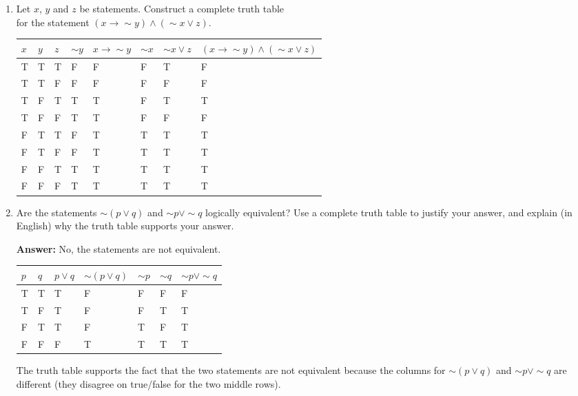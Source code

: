 \documentclass[12pt, letterpaper]{report}
\newcommand{\nott}{{\sim}}
\newcommand{\ans}{\textbf{Answer: }}
\begin{document}
\begin{enumerate}
\begin{enumerate}
        \end{enumerate}

	
	\item Let $x$, $y$ and $z$ be statements.  Construct a complete truth table\\ for the 
	statement $(x \to \nott y) \land (\nott x \lor z)$.
	
	\begin{tabular}{|l|l|l|l|l|l|l|l|} \hline
        $x$ & $y$ & $z$ & $\nott y$ & $x \to \nott y$ & $\nott x$ & $\nott x \lor z$ & $(x \to \nott y) \land (\nott x \lor z)$  \\ \hline
         T & T & T & F & F & F & T & F \\ \hline
         T & T & F & F & F & F & F & F \\ \hline
         T & F & T & T & T & F & T & T \\ \hline
         T & F & F & T & T & F & F & F \\ \hline
         F & T & T & F & T & T & T & T \\ \hline
         F & T & F & F & T & T & T & T \\ \hline
         F & F & T & T & T & T & T & T \\ \hline
         F & F & F & T & T & T & T & T \\ \hline
	\end{tabular}

	
	\item Are the statements $\nott (p \lor q)$ and $\nott p \lor \nott q$ logically equivalent?  Use a complete truth table to justify
	your answer, and explain (in English) why the truth table supports your answer.
	
	\ans No, the statements are not equivalent.
	
	\begin{tabular}{|l|l|l|l|l|l|l|} \hline
        $p$ & $q$ & $p \lor q$ & $\nott (p \lor q)$ & $\nott p$ & $\nott q$ & $\nott p \lor \nott q$   \\ \hline
         T & T & T & F & F & F & F \\ \hline
         T & F & T & F & F & T & T \\ \hline
         F & T & T & F & T & F & T \\ \hline
         F & F & F & T & T & T & T \\ \hline
	\end{tabular}
	
	The truth table supports the fact that the two statements are not equivalent because the columns for 
	$\nott (p \lor q)$ and $\nott p \lor \nott q$
	are different (they disagree on true/false for the two middle rows).

\end{enumerate}
\end{document}
